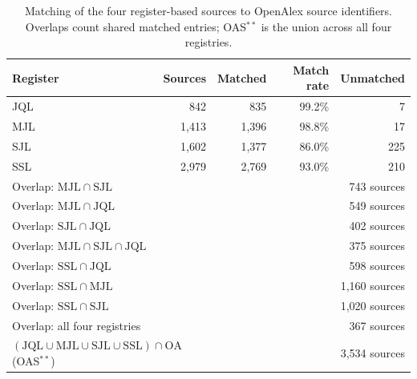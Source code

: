 \begin{table}[htbp]
\centering
\caption{Matching of the four register-based sources to OpenAlex source identifiers. Overlaps count shared matched entries; OAS$^{**}$ is the union across all four registries.}
\label{tab:source_matching}
\begin{tabular}{lrrrr}
\toprule
Register & Sources & Matched & Match rate & Unmatched \\
\midrule
JQL & 842 & 835 & 99.2\% & 7 \\
MJL & 1,413 & 1,396 & 98.8\% & 17 \\
SJL & 1,602 & 1,377 & 86.0\% & 225 \\
SSL & 2,979 & 2,769 & 93.0\% & 210 \\
\midrule
\multicolumn{2}{l}{Overlap: $\mathrm{MJL} \cap \mathrm{SJL}$} & \multicolumn{3}{r}{743 sources} \\
\multicolumn{2}{l}{Overlap: $\mathrm{MJL} \cap \mathrm{JQL}$} & \multicolumn{3}{r}{549 sources} \\
\multicolumn{2}{l}{Overlap: $\mathrm{SJL} \cap \mathrm{JQL}$} & \multicolumn{3}{r}{402 sources} \\
\multicolumn{2}{l}{Overlap: $\mathrm{MJL} \cap \mathrm{SJL} \cap \mathrm{JQL}$} & \multicolumn{3}{r}{375 sources} \\
\multicolumn{2}{l}{Overlap: $\mathrm{SSL} \cap \mathrm{JQL}$} & \multicolumn{3}{r}{598 sources} \\
\multicolumn{2}{l}{Overlap: $\mathrm{SSL} \cap \mathrm{MJL}$} & \multicolumn{3}{r}{1,160 sources} \\
\multicolumn{2}{l}{Overlap: $\mathrm{SSL} \cap \mathrm{SJL}$} & \multicolumn{3}{r}{1,020 sources} \\
\multicolumn{2}{l}{Overlap: all four registries} & \multicolumn{3}{r}{367 sources} \\
\multicolumn{2}{l}{$(\mathrm{JQL} \cup \mathrm{MJL} \cup \mathrm{SJL} \cup \mathrm{SSL}) \cap \mathrm{OA}$\quad (OAS$^{**}$)} & \multicolumn{3}{r}{3,534 sources} \\
\bottomrule
\end{tabular}
\end{table}
